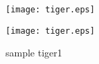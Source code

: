 \documentclass{jarticle}
\begin{document}
\begin{figure}[htbp]
    \begin{minipage}[c]{0.45\linewidth}
      \centering
      \texttt{[image: tiger.eps]}
    \end{minipage}
    \begin{minipage}[c]{0.45\linewidth}
      \centering
      \texttt{[image: tiger.eps]}
    \end{minipage}
    \caption{sample tiger1}
    \centering
  \end{figure}
\end{document}
